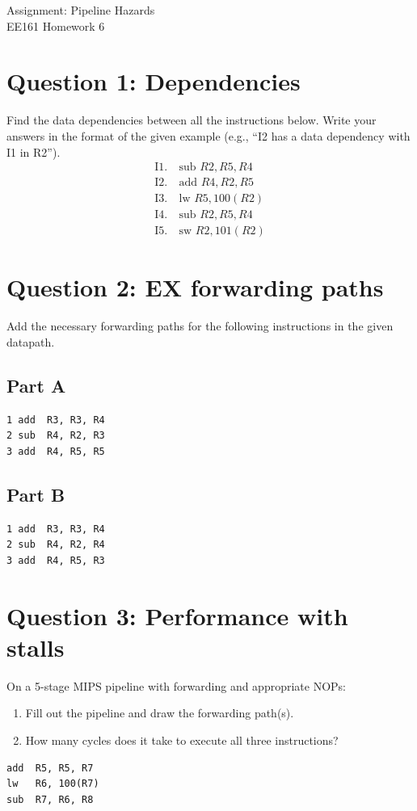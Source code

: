 \documentclass[11pt]{article}
\begin{document}
\begin{center}
    {\LARGE Assignment: Pipeline Hazards}\\[0.5em]
    {\large EE161 Homework 6}
\end{center}

\newpage
\section*{Question 1: Dependencies}
Find the data dependencies between all the instructions below. Write your answers in the format of the given example (e.g., ``I2 has a data dependency with I1 in R2'').
\[
\begin{aligned}
\text{I1.}&\ \text{sub\ } R2, R5, R4\\
\text{I2.}&\ \text{add\ } R4, R2, R5\\
\text{I3.}&\ \text{lw\ } R5, 100(R2)\\
\text{I4.}&\ \text{sub\ } R2, R5, R4\\
\text{I5.}&\ \text{sw\ } R2, 101(R2)
\end{aligned}
\]

\newpage
\section*{Question 2: EX forwarding paths}
Add the necessary forwarding paths for the following instructions in the given datapath.

\subsection*{Part A}
\begin{verbatim}
1 add  R3, R3, R4
2 sub  R4, R2, R3
3 add  R4, R5, R5
\end{verbatim}

\subsection*{Part B}
\begin{verbatim}
1 add  R3, R3, R4
2 sub  R4, R2, R4
3 add  R4, R5, R3
\end{verbatim}

\newpage
\section*{Question 3: Performance with stalls}
On a 5-stage MIPS pipeline with forwarding and appropriate NOPs:
\begin{enumerate}[label=\Alph*.]
    \item Fill out the pipeline and draw the forwarding path(s).
    \item How many cycles does it take to execute all three instructions?
\end{enumerate}
\begin{verbatim}
add  R5, R5, R7
lw   R6, 100(R7)
sub  R7, R6, R8
\end{verbatim}
\end{document}
